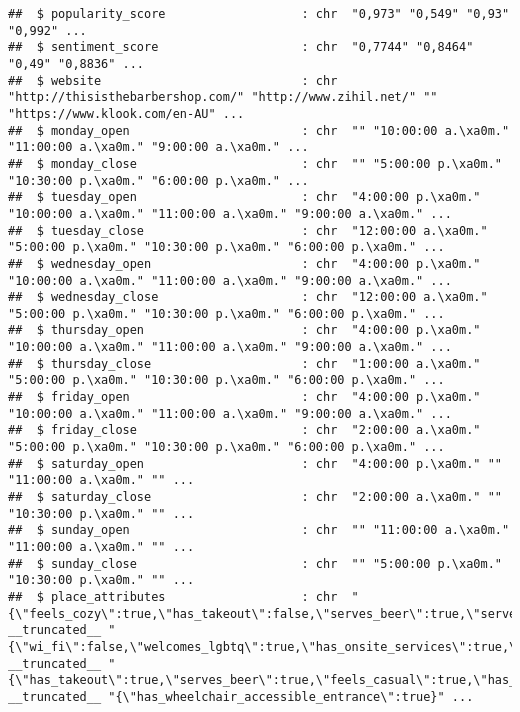 \documentclass[
]{article}
\begin{document}
\begin{verbatim}
##  $ popularity_score                   : chr  "0,973" "0,549" "0,93" "0,992" ...
##  $ sentiment_score                    : chr  "0,7744" "0,8464" "0,49" "0,8836" ...
##  $ website                            : chr  "http://thisisthebarbershop.com/" "http://www.zihil.net/" "" "https://www.klook.com/en-AU" ...
##  $ monday_open                        : chr  "" "10:00:00 a.\xa0m." "11:00:00 a.\xa0m." "9:00:00 a.\xa0m." ...
##  $ monday_close                       : chr  "" "5:00:00 p.\xa0m." "10:30:00 p.\xa0m." "6:00:00 p.\xa0m." ...
##  $ tuesday_open                       : chr  "4:00:00 p.\xa0m." "10:00:00 a.\xa0m." "11:00:00 a.\xa0m." "9:00:00 a.\xa0m." ...
##  $ tuesday_close                      : chr  "12:00:00 a.\xa0m." "5:00:00 p.\xa0m." "10:30:00 p.\xa0m." "6:00:00 p.\xa0m." ...
##  $ wednesday_open                     : chr  "4:00:00 p.\xa0m." "10:00:00 a.\xa0m." "11:00:00 a.\xa0m." "9:00:00 a.\xa0m." ...
##  $ wednesday_close                    : chr  "12:00:00 a.\xa0m." "5:00:00 p.\xa0m." "10:30:00 p.\xa0m." "6:00:00 p.\xa0m." ...
##  $ thursday_open                      : chr  "4:00:00 p.\xa0m." "10:00:00 a.\xa0m." "11:00:00 a.\xa0m." "9:00:00 a.\xa0m." ...
##  $ thursday_close                     : chr  "1:00:00 a.\xa0m." "5:00:00 p.\xa0m." "10:30:00 p.\xa0m." "6:00:00 p.\xa0m." ...
##  $ friday_open                        : chr  "4:00:00 p.\xa0m." "10:00:00 a.\xa0m." "11:00:00 a.\xa0m." "9:00:00 a.\xa0m." ...
##  $ friday_close                       : chr  "2:00:00 a.\xa0m." "5:00:00 p.\xa0m." "10:30:00 p.\xa0m." "6:00:00 p.\xa0m." ...
##  $ saturday_open                      : chr  "4:00:00 p.\xa0m." "" "11:00:00 a.\xa0m." "" ...
##  $ saturday_close                     : chr  "2:00:00 a.\xa0m." "" "10:30:00 p.\xa0m." "" ...
##  $ sunday_open                        : chr  "" "11:00:00 a.\xa0m." "11:00:00 a.\xa0m." "" ...
##  $ sunday_close                       : chr  "" "5:00:00 p.\xa0m." "10:30:00 p.\xa0m." "" ...
##  $ place_attributes                   : chr  "{\"feels_cozy\":true,\"has_takeout\":false,\"serves_beer\":true,\"serves_food\":true,\"serves_wine\":true,\"fee"| __truncated__ "{\"wi_fi\":false,\"welcomes_lgbtq\":true,\"has_onsite_services\":true,\"has_restroom_unisex\":true,\"requires_a"| __truncated__ "{\"has_takeout\":true,\"serves_beer\":true,\"feels_casual\":true,\"has_delivery\":true,\"serves_lunch\":true,\""| __truncated__ "{\"has_wheelchair_accessible_entrance\":true}" ...
\end{verbatim}
\end{document}
